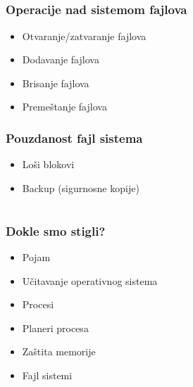 \documentclass{beamer}
\begin{document}
\subsection*{}

\begin{frame}
    \frametitle{Operacije nad sistemom fajlova}
    \begin{itemize}
        \item Otvaranje/zatvaranje fajlova \newline
        \item Dodavanje fajlova \newline
        \item Brisanje fajlova \newline
        \item Premeštanje fajlova
    \end{itemize}
\end{frame}

\begin{frame}
    \frametitle{Pouzdanost fajl sistema}
    \begin{itemize}
        \item Loši blokovi \newline
        \item Backup (sigurnosne kopije)
    \end{itemize}

    

\end{frame}

\subsection*{}
\section*{}

\begin{frame}
    \frametitle{Dokle smo stigli?}
    \begin{itemize}
        \item Pojam \newline
        \item Učitavanje operativnog sistema \newline
        \item Procesi \newline
        \item Planeri procesa \newline
        \item Zaštita memorije \newline
        \item Fajl sistemi
    \end{itemize}
\end{frame}
\end{document}

